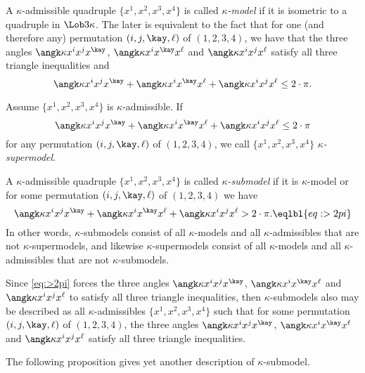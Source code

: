 A $\kappa$-admissible quadruple $\{x^1,x^2,x^3,x^4\}$
is called \emph{$\kappa$-model}
if it is isometric to a quadruple in $\Lob3\kappa$.
The later is equivalent to the fact that 
for one (and therefore any) permutation $(i,j,\kay,\ell)$
of $(1,2,3,4)$, 
we have that the three angles $\angk\kappa{x^i}{x^j}{x^\kay}$,
$\angk\kappa{x^i}{x^\kay}{x^\ell}$ and $\angk\kappa{x^i}{x^j}{x^\ell}$
satisfy all three triangle inequalities 
and
\[\angk\kappa{x^i}{x^j}{x^\kay}+\angk\kappa{x^i}{x^\kay}{x^\ell}+\angk\kappa{x^i}{x^j}{x^\ell}
\le 
2\cdot\pi.\]

Assume $\{x^1,x^2,x^3,x^4\}$ is $\kappa$-admissible.
If 
\[\angk\kappa{x^i}{x^j}{x^\kay}+\angk\kappa{x^i}{x^\kay}{x^\ell}+\angk\kappa{x^i}{x^j}{x^\ell}
\le 
2\cdot\pi\]
for any permutation $(i,j,\kay,\ell)$
of $(1,2,3,4)$, we call 
$\{x^1,x^2,x^3,x^4\}$ 
\emph{$\kappa$-supermodel}.

A $\kappa$-admissible quadruple $\{x^1,x^2,x^3,x^4\}$
is called \emph{$\kappa$-submodel} if it is $\kappa$-model
or for some permutation $(i,j,\kay,\ell)$
of $(1,2,3,4)$ we have 
\[\angk\kappa{x^i}{x^j}{x^\kay}+\angk\kappa{x^i}{x^\kay}{x^\ell}+\angk\kappa{x^i}{x^j}{x^\ell}
>
2\cdot\pi.\eqlbl{eq:>2pi}\]
In other words, 
$\kappa$-submodels 
consist of all $\kappa$-models and all $\kappa$-admissibles that are not $\kappa$-supermodels, and likewise $\kappa$-supermodels 
consist of all $\kappa$-models and all $\kappa$-admissibles that are not $\kappa$-submodels.

Since \ref{eq:>2pi} forces the three angles $\angk\kappa{x^i}{x^j}{x^\kay}$,
$\angk\kappa{x^i}{x^\kay}{x^\ell}$ and $\angk\kappa{x^i}{x^j}{x^\ell}$ to 
satisfy all three triangle inequalities, then $\kappa$-submodels also may be described as all $\kappa$-admissibles $\{x^1,x^2,x^3,x^4\}$ such that for some permutation $(i,j,\kay,\ell)$ of $(1,2,3,4)$, the three angles $\angk\kappa{x^i}{x^j}{x^\kay}$,
$\angk\kappa{x^i}{x^\kay}{x^\ell}$ and $\angk\kappa{x^i}{x^j}{x^\ell}$
satisfy all three triangle inequalities. 

The following proposition gives yet another description of $\kappa$-submodel.

